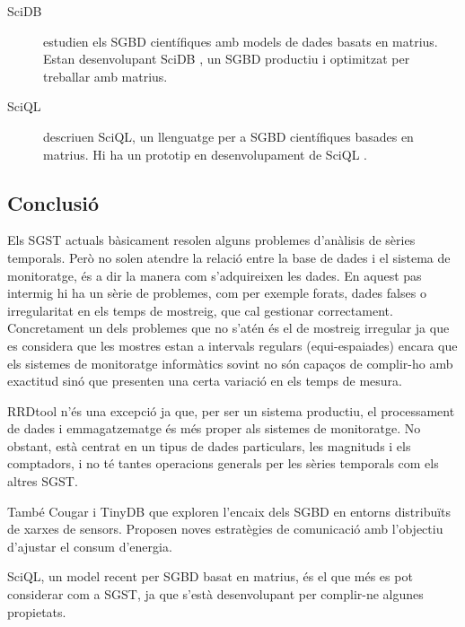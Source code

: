 \begin{description}
\item[SciDB]
\textcite{stonebraker09:scidb} estudien els SGBD científiques amb models  de dades basats en matrius. Estan desenvolupant SciDB \parencite{scidb}, un SGBD productiu i optimitzat per treballar amb matrius.


\item[SciQL]
\textcite{kersten11} descriuen SciQL, un llenguatge per a SGBD científiques basades en matrius. Hi ha un prototip en desenvolupament de SciQL \parencite{sciql}.


\end{description}


\subsection{Conclusió}

Els SGST actuals bàsicament resolen alguns problemes d'anàlisis de sèries temporals.
Però no solen atendre la relació entre la base de dades i el sistema de monitoratge, és a dir la manera com s'adquireixen les dades. En aquest pas intermig hi ha un sèrie de problemes, com per exemple forats, dades falses o irregularitat en els temps de mostreig, que cal gestionar correctament. Concretament un dels problemes que no s'atén és el de mostreig irregular ja que es considera que les mostres estan a intervals regulars (equi-espaiades) encara que els sistemes de monitoratge informàtics sovint no són capaços de complir-ho amb exactitud sinó que presenten una certa variació en els temps de mesura. 

RRDtool n'és una excepció ja que, per ser un sistema productiu, el processament de dades i emmagatzematge és més proper als sistemes de monitoratge. No obstant, està centrat en un tipus de dades particulars, les magnituds i els comptadors, i no té tantes operacions generals per les sèries temporals com els altres SGST.

També Cougar i TinyDB que exploren l'encaix dels SGBD en entorns distribuïts de xarxes de sensors. Proposen noves estratègies de comunicació amb l'objectiu d'ajustar el consum d'energia. 


SciQL, un model recent per SGBD  basat en matrius, és el que més es pot considerar com a SGST, ja que s'està desenvolupant per complir-ne algunes propietats.




